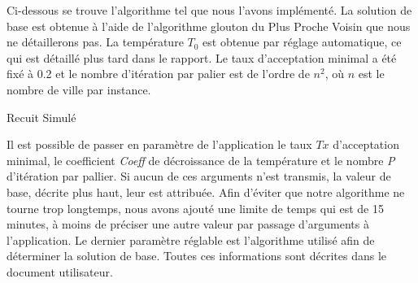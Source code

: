 \documentclass{article}
\begin{document}
Ci-dessous se trouve l'algorithme tel que nous l'avons implémenté.
La solution de base est obtenue à l'aide de l'algorithme glouton du Plus Proche Voisin que nous ne détaillerons pas.
La température $T_0$ est obtenue par réglage automatique, ce qui est détaillé plus tard dans le rapport.
Le taux d'acceptation minimal a été fixé à 0.2 et le nombre d'itération par palier est de l'ordre de $n^2$, où $n$ est le nombre de ville par instance.

\begin{algorithm}[H]
	\SetAlgoLined
	\caption{Recuit Simulé}
\end{algorithm}

Il est possible de passer en paramètre de l'application le taux \emph{$Tx$} d'acceptation minimal,
le coefficient \emph{Coeff} de décroissance de la température et le nombre \emph{P} d'itération par pallier.
Si aucun de ces arguments n'est transmis, la valeur de base, décrite plus haut, leur est attribuée.
Afin d'éviter que notre algorithme ne tourne trop longtemps, nous avons ajouté une limite de temps qui est de 15 minutes, à moins de préciser une autre valeur par passage d'arguments à l'application.
Le dernier paramètre réglable est l'algorithme utilisé afin de déterminer la solution de base.
Toutes ces informations sont décrites dans le document utilisateur.
\end{document}
